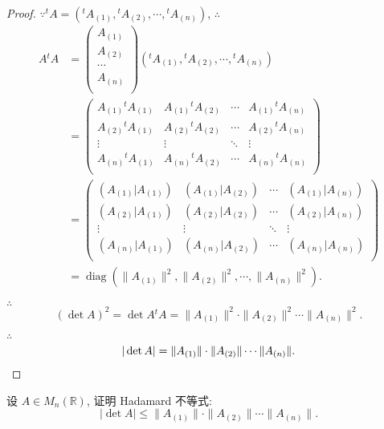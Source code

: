\documentclass{ctexart}
\begin{document}
\begin{proof}
    $\because{}^tA=({}^tA_{(1)},{}^tA_{(2)},\cdots,{}^tA_{(n)})$, $\therefore$
    \begin{align*}
        A{}^tA & =\begin{pmatrix}
            A_{(1)} \\
            A_{(2)} \\
            \cdots \\
            A_{(n)} \\
        \end{pmatrix}({}^tA_{(1)},{}^tA_{(2)},\cdots,{}^tA_{(n)}) \\
        & =\begin{pmatrix}
            A_{(1)}{}^tA_{(1)} & A_{(1)}{}^tA_{(2)} & \cdots & A_{(1)}{}^tA_{(n)} \\
            A_{(2)}{}^tA_{(1)} & A_{(2)}{}^tA_{(2)} & \cdots & A_{(2)}{}^tA_{(n)} \\
            \vdots  & \vdots  & \ddots & \vdots \\
            A_{(n)}{}^tA_{(1)} & A_{(n)}{}^tA_{(2)} & \cdots & A_{(n)}{}^tA_{(n)} \\
        \end{pmatrix} \\
        & =\begin{pmatrix}
            (A_{(1)}|A_{(1)}) & (A_{(1)}|A_{(2)}) & \cdots & (A_{(1)}|A_{(n)}) \\
            (A_{(2)}|A_{(1)}) & (A_{(2)}|A_{(2)}) & \cdots & (A_{(2)}|A_{(n)}) \\
            \vdots  & \vdots  & \ddots & \vdots \\
            (A_{(n)}|A_{(1)}) & (A_{(n)}|A_{(2)}) & \cdots & (A_{(n)}|A_{(n)}) \\
        \end{pmatrix} \\
        & =\operatorname{diag}(\|A_{(1)}\|^2,\|A_{(2)}\|^2,\cdots,\|A_{(n)}\|^2).
    \end{align*}

    $\therefore$
    \[(\det A)^2=\det A{}^tA=\|A_{(1)}\|^2\cdot\|A_{(2)}\|^2\cdots\|A_{(n)}\|^2.\]

    $\therefore$
    \[|\det A|=\|A_{(1)}\|\cdot\|A_{(2)}\|\cdots\|A_{(n)}\|.\qedhere\]
\end{proof}
\begin{exercise}
    设 $A\in M_n(\mathbb{R})$, 证明 Hadamard 不等式:
    \[|\det A|\leq\|A_{(1)}\|\cdot\|A_{(2)}\|\cdots\|A_{(n)}\|.\]
\end{exercise}
\end{document}
